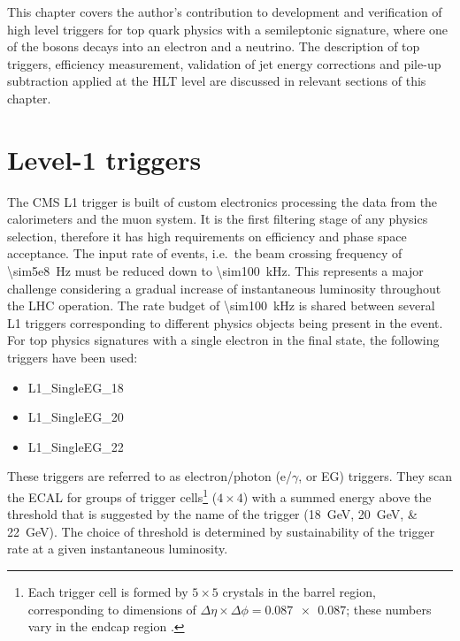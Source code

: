 This chapter covers the author's contribution to development and verification of high level triggers for top quark
physics with a semileptonic signature, where one of the \W bosons decays into an electron and a neutrino. The description
of top triggers, efficiency measurement, validation of jet energy corrections and pile-up subtraction applied at the HLT
level are discussed in relevant sections of this chapter.

\section{Level-1 triggers}
The CMS L1 trigger \autocite{CMS_L1_Trigger_TDR} is built of custom electronics processing the data from the
calorimeters and the muon system. It is the first filtering stage of any physics selection, therefore it has high
requirements on efficiency and phase space acceptance. The input rate of events, i.e.\ the beam crossing frequency of
\SI{\sim5e8}{\hertz} must be reduced down to \SI{\sim100}{\kilo\hertz}. This represents a major challenge considering a
gradual increase of instantaneous luminosity throughout the LHC operation. The rate budget of \SI{\sim100}{\kilo\hertz}
is shared between several L1 triggers corresponding to different physics objects being present in the event. For top
physics signatures with a single electron in the final state, the following triggers have been used:

\begin{itemize}
 \item L1\_SingleEG\_18
 \item L1\_SingleEG\_20
 \item L1\_SingleEG\_22
\end{itemize}

These triggers are referred to as electron/photon (e/$\gamma$, or EG) triggers. They scan the ECAL for groups of trigger
cells\footnote{Each trigger cell is formed by $5 \times 5$ crystals in the barrel region, corresponding to dimensions of
$\Delta\eta \times \Delta\phi = \num{0.087 x 0.087}$; these numbers vary in the endcap region
\autocite{CMS_L1_Trigger_TDR}.} ($4 \times 4$) with a summed energy above the threshold that is suggested by the name of
the trigger (\SIlist{18;20;22}{\GeV}). The choice of threshold is determined by sustainability of the trigger rate at a
given instantaneous luminosity.

